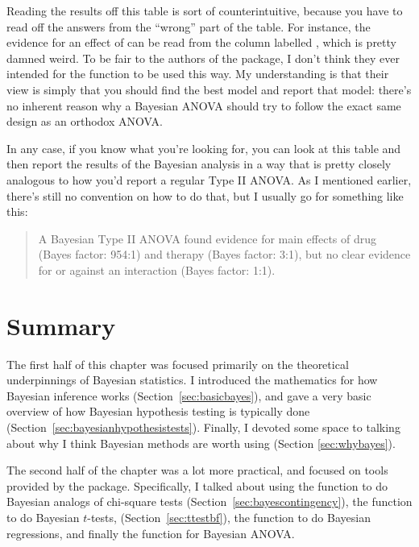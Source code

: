 Reading the results off this table is sort of counterintuitive, because you have to read off the answers from the ``wrong'' part of the table. For instance, the evidence for an effect of  can be read from the column labelled , which is pretty damned weird. To be fair to the authors of the package, I don't think they ever intended for the  function to be used this way. My understanding is that their view is simply that you should find the best model and report that model: there's no inherent reason why a Bayesian ANOVA should try to follow the exact same design as an orthodox ANOVA.

In any case, if you know what you're looking for, you can look at this table and then report the results of the Bayesian analysis in a way that is pretty closely analogous to how you'd report a regular Type II ANOVA. As I mentioned earlier, there's still no convention on how to do that, but I usually go for something like this:

\begin{quote}
A Bayesian Type II ANOVA found evidence for main effects of drug (Bayes factor: 954:1) and therapy (Bayes factor: 3:1), but no clear evidence for or against an interaction (Bayes factor: 1:1). 
\end{quote}


\section{Summary}

The first half of this chapter was focused primarily on the theoretical underpinnings of Bayesian statistics. I introduced the mathematics for how Bayesian inference works (Section~\ref{sec:basicbayes}), and gave a very basic overview of how Bayesian hypothesis testing is typically done (Section~\ref{sec:bayesianhypothesistests}). Finally, I devoted some space to talking about why I think Bayesian methods are worth using (Section \ref{sec:whybayes}).

The second half of the chapter was a lot more practical, and focused on tools provided by the  package. Specifically, I talked about using the  function to do Bayesian analogs of chi-square tests (Section~\ref{sec:bayescontingency}), the  function to do Bayesian $t$-tests, (Section~\ref{sec:ttestbf}), the  function to do Bayesian regressions, and finally the  function for Bayesian ANOVA. 

